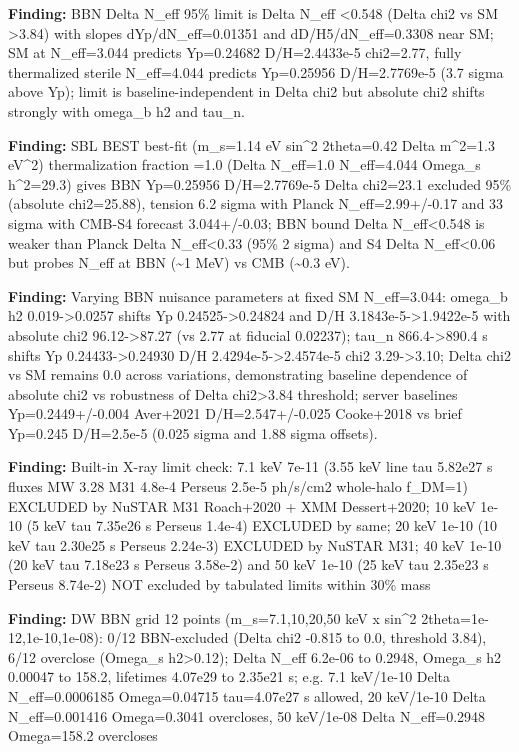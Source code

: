 \documentclass[11pt,a4paper]{article}
\begin{document}
\textbf{Finding:} BBN Delta N\_eff 95\% limit is Delta N\_eff \textless{}0.548 (Delta chi2 vs SM \textgreater{}3.84) with slopes dYp/dN\_eff=0.01351 and dD/H5/dN\_eff=0.3308 near SM; SM at N\_eff=3.044 predicts Yp=0.24682 D/H=2.4433e-5 chi2=2.77, fully thermalized sterile N\_eff=4.044 predicts Yp=0.25956 D/H=2.7769e-5 (3.7 sigma above Yp); limit is baseline-independent in Delta chi2 but absolute chi2 shifts strongly with omega\_b h2 and tau\_n.

\textbf{Finding:} SBL BEST best-fit (m\_s=1.14 eV sin\textasciicircum{}2 2theta=0.42 Delta m\textasciicircum{}2=1.3 eV\textasciicircum{}2) thermalization fraction =1.0 (Delta N\_eff=1.0 N\_eff=4.044 Omega\_s h\textasciicircum{}2=29.3) gives BBN Yp=0.25956 D/H=2.7769e-5 Delta chi2=23.1 excluded 95\% (absolute chi2=25.88), tension 6.2 sigma with Planck N\_eff=2.99+/-0.17 and 33 sigma with CMB-S4 forecast 3.044+/-0.03; BBN bound Delta N\_eff\textless{}0.548 is weaker than Planck Delta N\_eff\textless{}0.33 (95\% 2 sigma) and S4 Delta N\_eff\textless{}0.06 but probes N\_eff at BBN (\textasciitilde{}1 MeV) vs CMB (\textasciitilde{}0.3 eV).

\textbf{Finding:} Varying BBN nuisance parameters at fixed SM N\_eff=3.044: omega\_b h2 0.019-\textgreater{}0.0257 shifts Yp 0.24525-\textgreater{}0.24824 and D/H 3.1843e-5-\textgreater{}1.9422e-5 with absolute chi2 96.12-\textgreater{}87.27 (vs 2.77 at fiducial 0.02237); tau\_n 866.4-\textgreater{}890.4 s shifts Yp 0.24433-\textgreater{}0.24930 D/H 2.4294e-5-\textgreater{}2.4574e-5 chi2 3.29-\textgreater{}3.10; Delta chi2 vs SM remains 0.0 across variations, demonstrating baseline dependence of absolute chi2 vs robustness of Delta chi2\textgreater{}3.84 threshold; server baselines Yp=0.2449+/-0.004 Aver+2021 D/H=2.547+/-0.025 Cooke+2018 vs brief Yp=0.245 D/H=2.5e-5 (0.025 sigma and 1.88 sigma offsets).

\textbf{Finding:} Built-in X-ray limit check: 7.1 keV 7e-11 (3.55 keV line tau 5.82e27 s fluxes MW 3.28 M31 4.8e-4 Perseus 2.5e-5 ph/s/cm2 whole-halo f\_DM=1) EXCLUDED by NuSTAR M31 Roach+2020 + XMM Dessert+2020; 10 keV 1e-10 (5 keV tau 7.35e26 s Perseus 1.4e-4) EXCLUDED by same; 20 keV 1e-10 (10 keV tau 2.30e25 s Perseus 2.24e-3) EXCLUDED by NuSTAR M31; 40 keV 1e-10 (20 keV tau 7.18e23 s Perseus 3.58e-2) and 50 keV 1e-10 (25 keV tau 2.35e23 s Perseus 8.74e-2) NOT excluded by tabulated limits within 30\% mass

\textbf{Finding:} DW BBN grid 12 points (m\_s=7.1,10,20,50 keV x sin\textasciicircum{}2 2theta=1e-12,1e-10,1e-08): 0/12 BBN-excluded (Delta chi2 -0.815 to 0.0, threshold 3.84), 6/12 overclose (Omega\_s h2\textgreater{}0.12); Delta N\_eff 6.2e-06 to 0.2948, Omega\_s h2 0.00047 to 158.2, lifetimes 4.07e29 to 2.35e21 s; e.g. 7.1 keV/1e-10 Delta N\_eff=0.0006185 Omega=0.04715 tau=4.07e27 s allowed, 20 keV/1e-10 Delta N\_eff=0.001416 Omega=0.3041 overcloses, 50 keV/1e-08 Delta N\_eff=0.2948 Omega=158.2 overcloses
\end{document}
